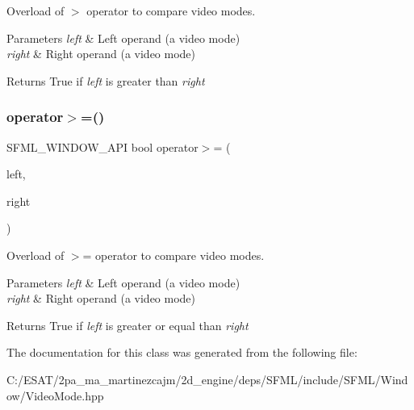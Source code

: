 Overload of $>$ operator to compare video modes. 


\begin{DoxyParams}{Parameters}
{\em left} & Left operand (a video mode) \\
\hline
{\em right} & Right operand (a video mode)\\
\hline
\end{DoxyParams}
\begin{DoxyReturn}{Returns}
True if {\itshape left} is greater than {\itshape right} 
\end{DoxyReturn}
\mbox{\label{classsf_1_1_video_mode_a7f7983e336203d34c9878c77fff60f1f}} 
\subsubsection{\texorpdfstring{operator$>$=()}{operator>=()}}
{\footnotesize\ttfamily S\+F\+M\+L\+\_\+\+W\+I\+N\+D\+O\+W\+\_\+\+A\+PI bool operator$>$= (\begin{DoxyParamCaption}\item[{const \hyperlink{classsf_1_1_video_mode}{Video\+Mode} \&}]{left,  }\item[{const \hyperlink{classsf_1_1_video_mode}{Video\+Mode} \&}]{right }\end{DoxyParamCaption})\hspace{0.3cm}{\ttfamily [related]}}



Overload of $>$= operator to compare video modes. 


\begin{DoxyParams}{Parameters}
{\em left} & Left operand (a video mode) \\
\hline
{\em right} & Right operand (a video mode)\\
\hline
\end{DoxyParams}
\begin{DoxyReturn}{Returns}
True if {\itshape left} is greater or equal than {\itshape right} 
\end{DoxyReturn}


The documentation for this class was generated from the following file\+:\begin{DoxyCompactItemize}
\item 
C\+:/\+E\+S\+A\+T/2pa\+\_\+ma\+\_\+martinezcajm/2d\+\_\+engine/deps/\+S\+F\+M\+L/include/\+S\+F\+M\+L/\+Window/Video\+Mode.\+hpp\end{DoxyCompactItemize}
